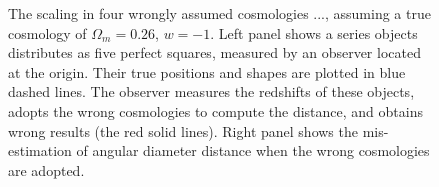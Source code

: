 \documentclass[iop]{emulateapj}
\begin{document}
\begin{figure}
   \caption{\label{fig_xyquan}
   The scaling in four wrongly assumed cosmologies ..., %
   assuming a true cosmology of $\Omega_m=0.26$, $w=-1$.
   Left panel shows a series objects distributes as five perfect squares, measured by an observer located at the origin.
   Their true positions and shapes are plotted in blue dashed lines.
   The observer measures the redshifts of these objects, adopts the wrong cosmologies to compute the distance,
   and obtains wrong results (the red solid lines).
   Right panel shows the mis-estimation of angular diameter distance when the wrong cosmologies are adopted.
   }
\end{figure}
\end{document}
